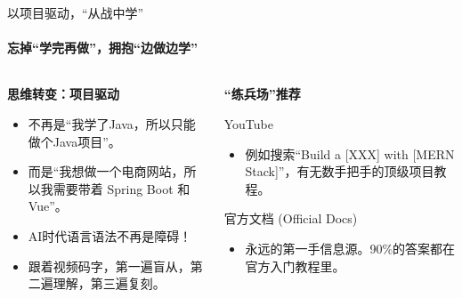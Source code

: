 \documentclass{beamer}
\begin{document}
\begin{frame}{以项目驱动，“从战中学”}
    \framesubtitle{忘掉“学完再做”，拥抱“边做边学”}
    
    \begin{columns}[T]
        \begin{column}{0.5\textwidth}
            \Large\textbf{思维转变：项目驱动}
            \begin{itemize}
                \item  不再是“我学了Java，所以只能做个Java项目”。
                \item  而是“我想做一个电商网站，所以我需要带着 \alert{Spring Boot} 和 \alert{Vue}”。
                \item  AI时代\alert{语言语法不再是障碍！} 
                \item 跟着视频码字，第一遍盲从，第二遍理解，第三遍复刻。
            \end{itemize}

        \end{column}
        
        \begin{column}{0.5\textwidth}
            \Large\textbf{“练兵场”推荐}
            \begin{center}
                \huge YouTube
            \end{center}
            \begin{itemize}
                \item \small 例如搜索“Build a [XXX] with [MERN Stack]”，有无数手把手的顶级项目教程。
            \end{itemize}
            
            
            \begin{center}
                \huge 官方文档 (Official Docs)
            \end{center}
            \begin{itemize}
                \item \small 永远的第一手信息源。90\%的答案都在官方入门教程里。
            \end{itemize}
        \end{column}
    \end{columns}
    
\end{frame}
\end{document}
